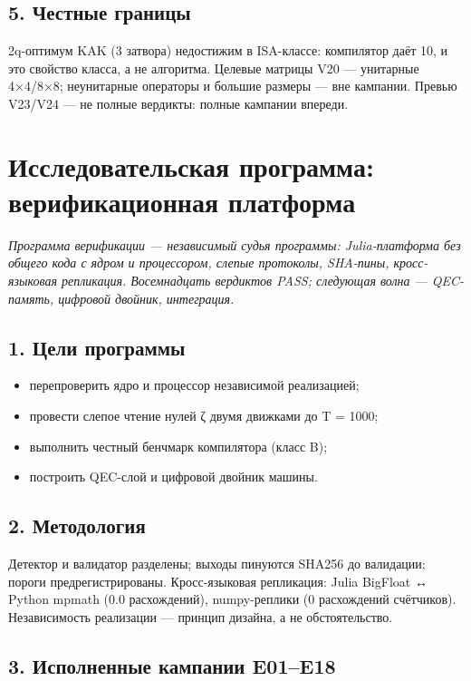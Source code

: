 \documentclass[11pt,a4paper]{article}
\begin{document}
\subsection{5. Честные границы}

2q-оптимум KAK (3 затвора) недостижим в ISA-классе: компилятор даёт 10, и это свойство класса, а не алгоритма. Целевые матрицы V20 — унитарные 4×4/8×8; неунитарные операторы и большие размеры — вне кампании. Превью V23/V24 — не полные вердикты: полные кампании впереди.

\section{Исследовательская программа: верификационная платформа}

\noindent\textit{\color{copper}Программа верификации — независимый судья программы: Julia-платформа без общего кода с ядром и процессором, слепые протоколы, SHA-пины, кросс-языковая репликация. Восемнадцать вердиктов PASS; следующая волна — QEC-память, цифровой двойник, интеграция.}

\subsection{1. Цели программы}

\begin{itemize}
  \item перепроверить ядро и процессор независимой реализацией;
  \item провести слепое чтение нулей ζ двумя движками до T = 1000;
  \item выполнить честный бенчмарк компилятора (класс B);
  \item построить QEC-слой и цифровой двойник машины.
\end{itemize}

\subsection{2. Методология}

Детектор и валидатор разделены; выходы пинуются SHA256 до валидации; пороги предрегистрированы. Кросс-языковая репликация: Julia BigFloat ↔ Python mpmath (0.0 расхождений), numpy-реплики (0 расхождений счётчиков). Независимость реализации — принцип дизайна, а не обстоятельство.

\subsection{3. Исполненные кампании E01–E18}
\end{document}
